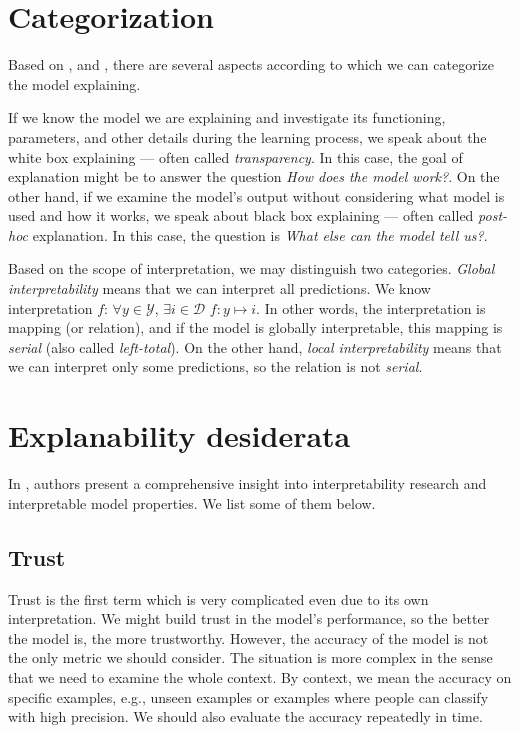 \section{Categorization}
Based on \cite{Guidotti2018}, and \cite{Lipton2016}, there are several aspects according to which we can categorize the model explaining.

If we know the model we are explaining and investigate its functioning, parameters, and other details during the learning process, we speak about the white box explaining --- often called \emph{transparency}. In this case, the goal of explanation might be to answer the question \emph{How does the model work?}. On the other hand, if we examine the model's output without considering what model is used and how it works, we speak about black box explaining --- often called \emph{post-hoc} explanation. In this case, the question is \emph{What else can the model tell us?}.

Based on the scope of interpretation, we may distinguish two categories. \emph{Global interpretability} means that we can interpret all predictions. We know interpretation $f$: $\forall y \in \mathcal{Y}$, $\exists i \in \mathcal{D}$ $f: y\mapsto i$. In other words, the interpretation is mapping (or relation), and if the model is globally interpretable, this mapping is \emph{serial} (also called \emph{left-total}). On the other hand, \emph{local interpretability} means that we can interpret only some predictions, so the relation is not \emph{serial}.

\section{Explanability desiderata}
In \cite{Lipton2016}, authors present a comprehensive insight into interpretability research and interpretable model properties. We list some of them below.

\subsection{Trust}
Trust is the first term which is very complicated even due to its own interpretation. We might build trust in the model's performance, so the better the model is, the more trustworthy. However, the accuracy of the model is not the only metric we should consider. The situation is more complex in the sense that we need to examine the whole context. By context, we mean the accuracy on specific examples, e.g., unseen examples or examples where people can classify with high precision. We should also evaluate the accuracy repeatedly in time.

